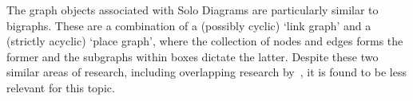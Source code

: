     \begin{remark*}
        The graph objects associated with Solo Diagrams are particularly similar to bigraphs.
        These are a combination of a (possibly cyclic) `link graph' and a (strictly acyclic) `place graph', where the collection of nodes and edges forms the former and the subgraphs within boxes dictate the latter.
        Despite these two similar areas of research, including overlapping research by~\cite{bigraphs-pervasive-calculus}, it is found to be less relevant for this topic.
    \end{remark*}

